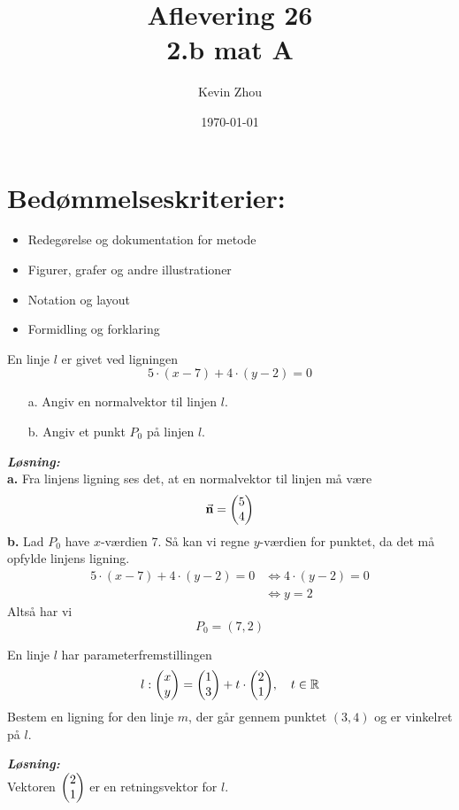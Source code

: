 \documentclass{article}
\title{Aflevering 26\\
{\Large \textbf{2.b mat A}}}
\author{Kevin Zhou}
\date{\today}
\newcommand{\sol}{\setlength{\parindent}{0cm}\textbf{\textit{Løsning:}}\setlength{\parindent}{1cm}}
\begin{document}
\maketitle
\section*{Bedømmelseskriterier:}
\begin{itemize}
    \setlength\itemsep{3cm}
    \Large
    \item  Redegørelse og dokumentation for metode
    \item Figurer, grafer og andre illustrationer
    \item Notation og layout
    \item Formidling og forklaring
\end{itemize}
\pagebreak
\begin{question}{}{}
  En linje $l$ er givet ved ligningen
  \[
  5 \cdot \left(x-7\right) +4 \cdot \left(y-2\right) =0
  \] 
  \begin{itemize}
    \item[a.] Angiv en normalvektor til linjen $l$.
    \item[b.] Angiv et punkt $P_0$ på linjen $l$. 
  \end{itemize}
\end{question}
\sol \\
\textbf{a.}
Fra linjens ligning ses det, at en normalvektor til linjen må være
\[
\va{n} =\mqty(5\\ 4) 
\] 
\textbf{b.}
Lad $P_0$ have $x$-værdien 7. 
Så kan vi regne $y$-værdien for punktet, da det må opfylde linjens ligning.
\begin{equation*}
\begin{split}
  5 \cdot \left(x-7\right) +4 \cdot \left(y-2\right) =0 &\iff 4 \cdot \left(y-2\right) =0 \\ 
  &\iff y=2
\end{split}
\end{equation*}
Altså har vi
\[
P_0=(7,2)
\] 
\begin{question}{}{}
  En linje $l$ har parameterfremstillingen
  \[
  l: \mqty(x\\ y) =\mqty(1\\ 3) + t \cdot \mqty(2\\ 1), \quad t \in \mathbb{R}
  \] 
  Bestem en ligning for den linje $m$, der går gennem punktet $(3,4)$ og er vinkelret på $l$.
\end{question}
\sol \\
Vektoren $\mqty(2\\ 1) $ er en retningsvektor for $l$.
\end{document}
